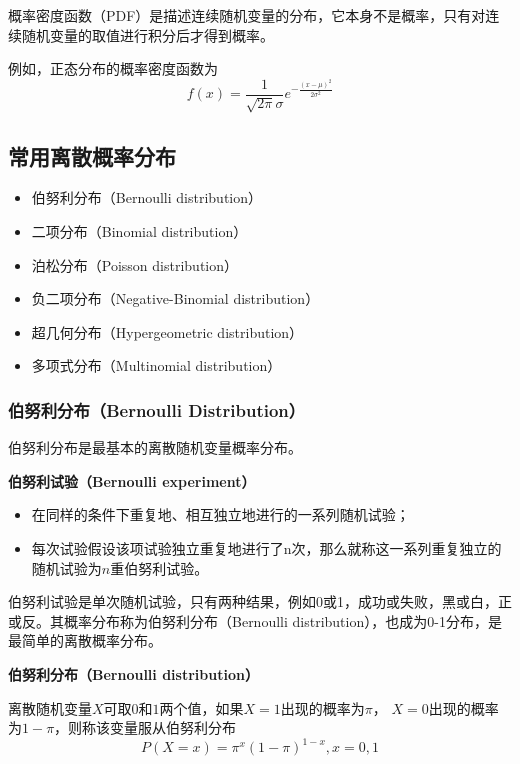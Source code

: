 概率密度函数（PDF）是描述连续随机变量的分布，它本身不是概率，只有对连续随机变量的取值进行积分后才得到概率。

例如，正态分布的概率密度函数为
\begin{equation}
    f(x) = \frac{1}{\sqrt{2\pi}\sigma}e^{-\frac{(x-\mu)^2}{2\sigma^2}}
\end{equation}

\subsection{常用离散概率分布}

\begin{itemize}[itemsep=0pt,parsep=0pt]
    \item 伯努利分布（Bernoulli distribution）
    \item 二项分布（Binomial distribution）
    \item 泊松分布（Poisson distribution）
    \item 负二项分布（Negative-Binomial distribution）
    \item 超几何分布（Hypergeometric distribution）
    \item 多项式分布（Multinomial distribution）
\end{itemize}

\subsubsection{伯努利分布（Bernoulli Distribution）}

伯努利分布是最基本的离散随机变量概率分布。

\textbf{伯努利试验（Bernoulli experiment）}

\begin{itemize}[itemsep=0pt,parsep=0pt]
    \item 在同样的条件下重复地、相互独立地进行的一系列随机试验；
    \item 每次试验假设该项试验独立重复地进行了n次，那么就称这一系列重复独立的随机试验为$n$重伯努利试验。
\end{itemize}

伯努利试验是单次随机试验，只有两种结果，例如0或1，成功或失败，黑或白，正或反。其概率分布称为伯努利分布（Bernoulli distribution），也成为0-1分布，是最简单的离散概率分布。

\textbf{伯努利分布（Bernoulli distribution）}

离散随机变量$X$可取$0$和$1$两个值，如果$X=1$出现的概率为$\pi$， $X=0$出现的概率为$1-\pi$，则称该变量服从伯努利分布
\begin{equation}
    P(X = x) = \pi^x(1-\pi)^{1-x}, x = 0,1
\end{equation}

